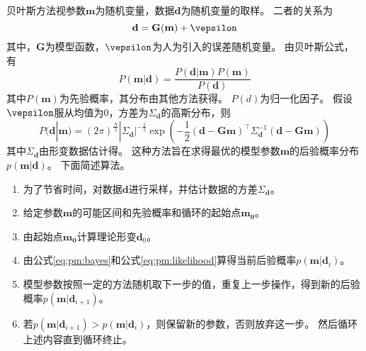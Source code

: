 贝叶斯方法视参数$\mathbf{m}$为随机变量，数据$\mathbf{d}$为随机变量的取样。
二者的关系为
\begin{equation}
    \mathbf{d}=\mathbf{G}(\mathbf{m})+\vepsilon
\end{equation}
其中，$\mathbf{G}$为模型函数，$\vepsilon$为人为引入的误差随机变量。
由贝叶斯公式，有
\begin{equation}
    \label{eq:pm:bayes}
    P(\mathbf{m}|\mathbf{d})=\frac{P(\mathbf{d}|\mathbf{m})P(\mathbf{m})}{P(\mathbf{d})}
\end{equation}
其中$P(\mathbf{m})$为先验概率，其分布由其他方法获得。
$P(d)$为归一化因子。
假设$\vepsilon$服从均值为$0$，方差为$\Sigma_{\mathbf{d}}$的高斯分布，则
\begin{equation}
    \label{eq:pm:likelihood}
    P(\mathbf{d}|\mathbf{m})=(2\pi)^{\frac{N}{2}}|\Sigma_{\mathbf{d}}|^{-\frac{1}{2}}
    \exp\left(-\frac{1}{2}(\mathbf{d-Gm})^{\top}\Sigma_{\mathbf{d}}^{-1}(\mathbf{d-Gm})\right)
\end{equation}
其中$\Sigma_{\mathbf{d}}$由形变数据估计得。
这种方法旨在求得最优的模型参数$\mathbf{m}$的后验概率分布$p(\mathbf{m}|\mathbf{d})$。
下面简述算法。
\begin{enumerate}
    \item 为了节省时间，对数据$\mathbf{d}$进行采样，并估计数据的方差$\Sigma_{\mathbf{d}}$。
    \item 给定参数$\mathbf{m}$的可能区间和先验概率和循环的起始点$\mathbf{m_0}$。
    \item 由起始点$\mathbf{m_0}$计算理论形变$\mathbf{d}_0$。
    \item 由公式\ref{eq:pm:bayes}和公式\ref{eq:pm:likelihood}算得当前后验概率$p(\mathbf{m}|\mathbf{d}_i)$。
    \item 模型参数按照一定的方法随机取下一步的值，重复上一步操作，得到新的后验概率$p(\mathbf{m}|\mathbf{d}_{i+1})$。
    \item 若$p(\mathbf{m}|\mathbf{d}_{i+1})>p(\mathbf{m}|\mathbf{d}_i)$，则保留新的参数，否则放弃这一步。
          然后循环上述内容直到循环终止。
\end{enumerate}
